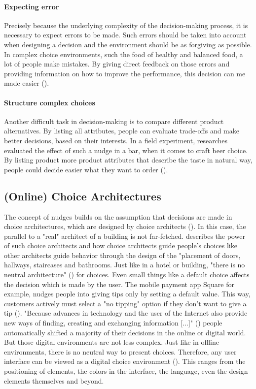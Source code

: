 \paragraph{Expecting error}
Precisely because the underlying complexity of the decision-making process, it is necessary to expect errors to be made. Such errors should be taken into account when designing a decision and the environment should be as forgiving as possible. In complex choice environments, such the food of healthy and balanced food, a lot of people make mistakes. By giving direct feedback on those errors and providing information on how to improve the performance, this decision can me made easier (\cite{guthrie_nudging_2015}).
\paragraph{Structure complex choices}
Another difficult task in decision-making is to compare different product alternatives. By listing all attributes, people can evaluate trade-offs and make better decisions, based on their interests. In a field experiment, researches evaluated the effect of such a nudge in a bar, when it comes to craft beer choice. By listing product more product attributes that describe the taste in natural way, people could decide easier what they want to order (\cite{malone_excessive_2017}).


\subsection{(Online) Choice Architectures}
The concept of nudges builds on the assumption that decisions are made in choice architectures, which are designed by choice architects (\cite{thaler_nudge:_2009}). In this case, the parallel to a "real" architect of a building is not far-fetched. \cite{johnson_beyond_2012} describes the power of such choice architects and how choice architects guide people's choices like other architects guide behavior through the design of the "placement of doors, hallways, staircases and bathrooms. Just like in a hotel or building, "there is no neutral architecture" (\cite{johnson_beyond_2012}) for choices. Even small things like a default choice affects the decision which is made by the user. The mobile payment app Square for example, nudges people into giving tips only by setting a default value. This way, customers actively must select a "no tipping" option if they don't want to give a tip (\cite{weinmann_digital_2016}). "Because advances in technology and the user of the Internet also provide new ways of finding, creating and exchanging information [...]" (\cite{broniarczyk_decision_2014}) people automatically shifted a majority of their decisions in the online or digital world. But those digital environments are not less complex. Just like in offline environments, there is no neutral way to present choices. Therefore, any user interface can be viewed as a digital choice environment (\cite{schneider_digital_2018}). This ranges from the positioning of elements, the colors in the interface, the language, even the design elements themselves and beyond.

